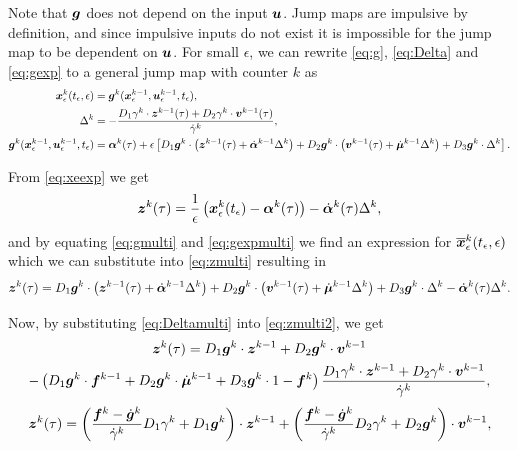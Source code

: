 \documentclass[DC2017114Bouma.tex]{subfiles}
\begin{document}
Note that ${\boldsymbol{g}}$ does not depend on the input ${\boldsymbol{u}}$. Jump maps are impulsive by definition, and since impulsive inputs do not exist it is impossible for the jump map to be dependent on ${\boldsymbol{u}}$. For small $\epsilon$, we can rewrite \eqref{eq:g}, \eqref{eq:Delta} and \eqref{eq:gexp} to a general jump map with counter $k$ as
\begin{align}
{\boldsymbol{x}}^{k}_\epsilon(t_\epsilon,\epsilon) &= {\boldsymbol{g}}^k({\boldsymbol{x}}^{k-1}_\epsilon,{\boldsymbol{u}}^{k-1}_\epsilon,t_\epsilon),\label{eq:gmulti}\\
\Delta^{k} &= -\frac{D_1 \gamma^{k}\cdot {\boldsymbol{z}}^{k-1}(\tau) + D_2 \gamma^{k}\cdot {\boldsymbol{v}}^{k-1}(\tau)}{\dot{\gamma}^{k}}, \label{eq:Deltamulti}\\
{\boldsymbol{g}}^k({\boldsymbol{x}}^{k-1}_\epsilon,{\boldsymbol{u}}^{k-1}_\epsilon,t_\epsilon) &= \boldsymbol{\alpha}^k(\tau) + \epsilon\left[D_1{\boldsymbol{g}}^k\cdot \left({\boldsymbol{z}}^{k-1} (\tau) + \dot{\boldsymbol{\alpha}}^{k-1}\Delta^k \right) + D_2{\boldsymbol{g}}^k\cdot \left({\boldsymbol{v}}^{k-1} (\tau) + \dot{\boldsymbol{\mu}}^{k-1}\Delta^k \right) + D_3{\boldsymbol{g}}^k\cdot \Delta^k \right].\label{eq:gexpmulti}
\end{align}

From \eqref{eq:xeexp} we get
\begin{align}
{\boldsymbol{z}}^k(\tau) = \frac{1}{\epsilon}\left({\boldsymbol{x}}^{k}_\epsilon(t_\epsilon) - \boldsymbol{\alpha}^k(\tau)\right) -\dot{\boldsymbol{\alpha}}^k(\tau)\Delta^k,\label{eq:zmulti}
\end{align}
and by equating \eqref{eq:gmulti} and \eqref{eq:gexpmulti} we find an expression for $\overline{{\boldsymbol{x}}}^{k}_\epsilon(t_\epsilon,\epsilon)$ which we can substitute into \eqref{eq:zmulti} resulting in
\begin{align}
{\boldsymbol{z}}^k(\tau) = D_1{\boldsymbol{g}}^k\cdot\left({\boldsymbol{z}}^{k-1} (\tau) + \dot{\boldsymbol{\alpha}}^{k-1}\Delta^k \right) + D_2{\boldsymbol{g}}^k\cdot \left({\boldsymbol{v}}^{k-1} (\tau) + \dot{\boldsymbol{\mu}}^{k-1}\Delta^k \right) + D_3{\boldsymbol{g}}^k\cdot\Delta^k -\dot{\boldsymbol{\alpha}}^k(\tau)\Delta^k. \label{eq:zmulti2}
\end{align}

Now, by substituting \eqref{eq:Deltamulti} into \eqref{eq:zmulti2}, we get
\begin{multline}
{\boldsymbol{z}}^k(\tau) = D_1{\boldsymbol{g}}^k\cdot{\boldsymbol{z}}^{k-1} + D_2{\boldsymbol{g}}^k\cdot{\boldsymbol{v}}^{k-1} \\- \left(D_1{\boldsymbol{g}}^k\cdot {\boldsymbol{f}}^{k-1} + D_2{\boldsymbol{g}}^k\cdot \dot{\boldsymbol{\mu}}^{k-1} + D_3{\boldsymbol{g}}^k\cdot 1 - {\boldsymbol{f}}^k\right)\frac{D_1\gamma^k\cdot{\boldsymbol{z}}^{k-1} + D_2\gamma^k\cdot{\boldsymbol{v}}^{k-1}}{\dot{\gamma}^k},
\end{multline}
\begin{align}
{\boldsymbol{z}}^k(\tau) = \left(\frac{{\boldsymbol{f}}^k - \dot{{\boldsymbol{g}}}^k}{\dot{\gamma}^k}D_1\gamma^k + D_1{\boldsymbol{g}}^k \right)\cdot{\boldsymbol{z}}^{k-1} + \left(\frac{{\boldsymbol{f}}^k - \dot{{\boldsymbol{g}}}^k}{\dot{\gamma}^k}D_2\gamma^k + D_2{\boldsymbol{g}}^k \right)\cdot{\boldsymbol{v}}^{k-1},\label{eq:zmulti3}
\end{align}
\end{document}
